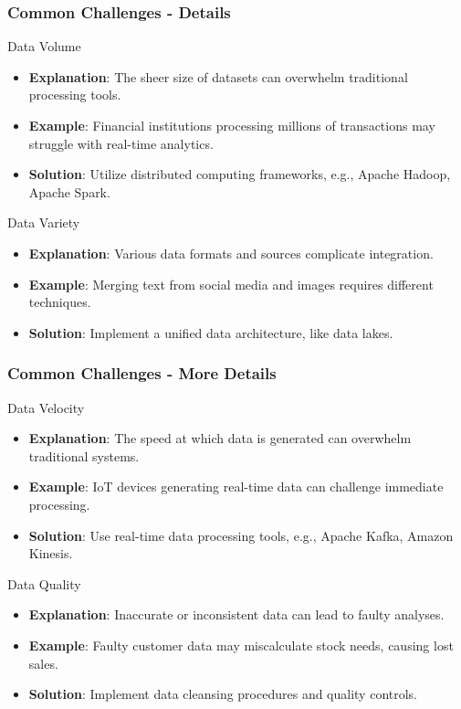 \documentclass[aspectratio=169]{beamer}
\begin{document}
\begin{frame}[fragile]
    \frametitle{Common Challenges - Details}
    \begin{block}{Data Volume}
        \begin{itemize}
            \item \textbf{Explanation}: The sheer size of datasets can overwhelm traditional processing tools.
            \item \textbf{Example}: Financial institutions processing millions of transactions may struggle with real-time analytics.
            \item \textbf{Solution}: Utilize distributed computing frameworks, e.g., Apache Hadoop, Apache Spark.
        \end{itemize}
    \end{block}

    \begin{block}{Data Variety}
        \begin{itemize}
            \item \textbf{Explanation}: Various data formats and sources complicate integration.
            \item \textbf{Example}: Merging text from social media and images requires different techniques.
            \item \textbf{Solution}: Implement a unified data architecture, like data lakes.
        \end{itemize}
    \end{block}
\end{frame}

\begin{frame}[fragile]
    \frametitle{Common Challenges - More Details}
    \begin{block}{Data Velocity}
        \begin{itemize}
            \item \textbf{Explanation}: The speed at which data is generated can overwhelm traditional systems.
            \item \textbf{Example}: IoT devices generating real-time data can challenge immediate processing.
            \item \textbf{Solution}: Use real-time data processing tools, e.g., Apache Kafka, Amazon Kinesis.
        \end{itemize}
    \end{block}

    \begin{block}{Data Quality}
        \begin{itemize}
            \item \textbf{Explanation}: Inaccurate or inconsistent data can lead to faulty analyses.
            \item \textbf{Example}: Faulty customer data may miscalculate stock needs, causing lost sales.
            \item \textbf{Solution}: Implement data cleansing procedures and quality controls.
        \end{itemize}
    \end{block}
\end{frame}
\end{document}
